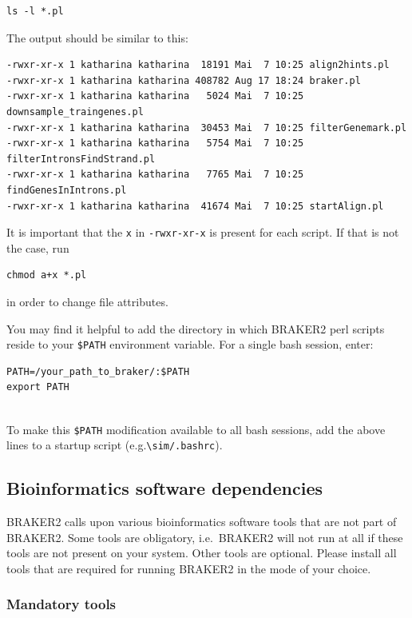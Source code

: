 \documentclass[]{article}
\begin{document}
\begin{verbatim}
ls -l *.pl
\end{verbatim}

The output should be similar to this:

\begin{verbatim}
-rwxr-xr-x 1 katharina katharina  18191 Mai  7 10:25 align2hints.pl
-rwxr-xr-x 1 katharina katharina 408782 Aug 17 18:24 braker.pl
-rwxr-xr-x 1 katharina katharina   5024 Mai  7 10:25 downsample_traingenes.pl
-rwxr-xr-x 1 katharina katharina  30453 Mai  7 10:25 filterGenemark.pl
-rwxr-xr-x 1 katharina katharina   5754 Mai  7 10:25 filterIntronsFindStrand.pl
-rwxr-xr-x 1 katharina katharina   7765 Mai  7 10:25 findGenesInIntrons.pl
-rwxr-xr-x 1 katharina katharina  41674 Mai  7 10:25 startAlign.pl
\end{verbatim}

It is important that the \texttt{x} in \texttt{-rwxr-xr-x} is present
for each script. If that is not the case, run

\begin{verbatim}
chmod a+x *.pl
\end{verbatim}

in order to change file attributes.

You may find it helpful to add the directory in which BRAKER2 perl
scripts reside to your \texttt{\$PATH} environment variable. For a
single bash session, enter:

\begin{verbatim}
PATH=/your_path_to_braker/:$PATH
export PATH
    
\end{verbatim}

To make this \texttt{\$PATH} modification available to all bash
sessions, add the above lines to a startup script
(e.g.\texttt{\textbackslash{}sim/.bashrc}).

\subsection{Bioinformatics software dependencies}\label{bioinformatics-software-dependencies}

BRAKER2 calls upon various bioinformatics software tools that are not
part of BRAKER2. Some tools are obligatory, i.e.~BRAKER2 will not run at
all if these tools are not present on your system. Other tools are
optional. Please install all tools that are required for running BRAKER2
in the mode of your choice.

\subsubsection{Mandatory tools}\label{mandatory-tools}
\end{document}
